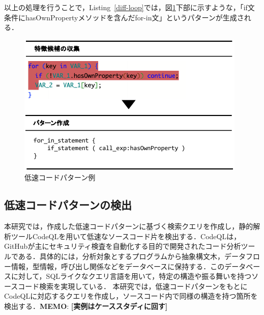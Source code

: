 \documentclass[submit,techrep,noauthor]{ipsj}
\newcommand{\todo}[1]{\colorbox{yellow}{{\bf TODO}:}{\color{red} {\textbf{[#1]}}}}
\newcommand{\memo}[1]{\colorbox{magenta!30}{{\bf MEMO}:}{\color{red!50} {\textbf{[#1]}}}}
\begin{document}
以上の処理を行うことで，Listing~\ref{diff-loop}では，図\ref{fig:slow_pattern}下部に示すような，「if文条件にhasOwnPropertyメソッドを含んだfor-in文」というパターンが生成される．

\begin{figure}[t]
    \centering
    \includegraphics[width=0.9\linewidth]{./Noguchi_fig/slow_pattern.pdf}
    \caption{低速コードパターン例}
    \label{fig:slow_pattern}
\end{figure}

\subsection{低速コードパターンの検出}

本研究では，作成した低速コードパターンに基づく検索クエリを作成し，静的解析ツールCodeQL\cite{ql}を用いて低速なソースコード片を検出する．CodeQLは，GitHubが主にセキュリティ検査を自動化する目的で開発されたコード分析ツールである．具体的には，分析対象とするプログラムから抽象構文木，データフロー情報，型情報，呼び出し関係などをデータベースに保持する．このデータベースに対して，SQLライクなクエリ言語を用いて，特定の構造や振る舞いを持つソースコード検索を実現している．
本研究では，低速コードパターンをもとにCodeQLに対応するクエリを作成し，ソースコード内で同様の構造を持つ箇所を検出する．\memo{実例はケーススタディに回す}

\end{document}
